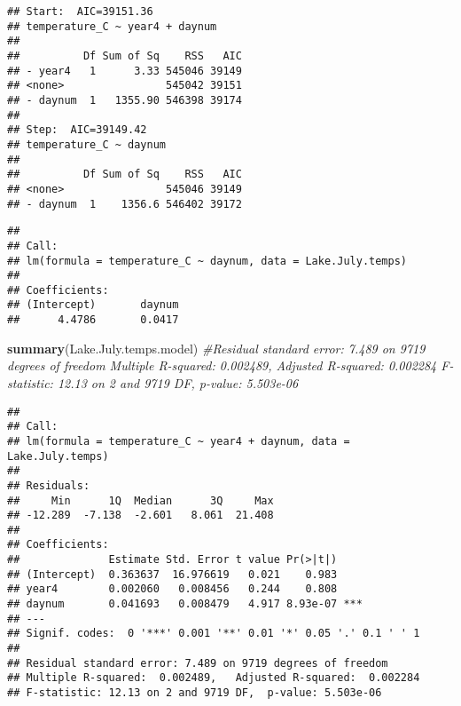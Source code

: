 \documentclass[]{article}
\newenvironment{Shaded}{\begin{snugshade}}{\end{snugshade}}
\newcommand{\KeywordTok}[1]{\textcolor[rgb]{0.13,0.29,0.53}{\textbf{#1}}}
\newcommand{\DataTypeTok}[1]{\textcolor[rgb]{0.13,0.29,0.53}{#1}}
\newcommand{\StringTok}[1]{\textcolor[rgb]{0.31,0.60,0.02}{#1}}
\newcommand{\CommentTok}[1]{\textcolor[rgb]{0.56,0.35,0.01}{\textit{#1}}}
\newcommand{\OperatorTok}[1]{\textcolor[rgb]{0.81,0.36,0.00}{\textbf{#1}}}
\newcommand{\NormalTok}[1]{#1}
\begin{document}
\begin{verbatim}
## Start:  AIC=39151.36
## temperature_C ~ year4 + daynum
## 
##          Df Sum of Sq    RSS   AIC
## - year4   1      3.33 545046 39149
## <none>                545042 39151
## - daynum  1   1355.90 546398 39174
## 
## Step:  AIC=39149.42
## temperature_C ~ daynum
## 
##          Df Sum of Sq    RSS   AIC
## <none>                545046 39149
## - daynum  1    1356.6 546402 39172
\end{verbatim}

\begin{verbatim}
## 
## Call:
## lm(formula = temperature_C ~ daynum, data = Lake.July.temps)
## 
## Coefficients:
## (Intercept)       daynum  
##      4.4786       0.0417
\end{verbatim}

\begin{Shaded}
\begin{Highlighting}[]
\KeywordTok{summary}\NormalTok{(Lake.July.temps.model) }\CommentTok{#Residual standard error: 7.489 on 9719 degrees of freedom Multiple R-squared:  0.002489,    Adjusted R-squared:  0.002284 F-statistic: 12.13 on 2 and 9719 DF,  p-value: 5.503e-06}
\end{Highlighting}
\end{Shaded}

\begin{verbatim}
## 
## Call:
## lm(formula = temperature_C ~ year4 + daynum, data = Lake.July.temps)
## 
## Residuals:
##     Min      1Q  Median      3Q     Max 
## -12.289  -7.138  -2.601   8.061  21.408 
## 
## Coefficients:
##              Estimate Std. Error t value Pr(>|t|)    
## (Intercept)  0.363637  16.976619   0.021    0.983    
## year4        0.002060   0.008456   0.244    0.808    
## daynum       0.041693   0.008479   4.917 8.93e-07 ***
## ---
## Signif. codes:  0 '***' 0.001 '**' 0.01 '*' 0.05 '.' 0.1 ' ' 1
## 
## Residual standard error: 7.489 on 9719 degrees of freedom
## Multiple R-squared:  0.002489,   Adjusted R-squared:  0.002284 
## F-statistic: 12.13 on 2 and 9719 DF,  p-value: 5.503e-06
\end{verbatim}

\begin{Shaded}
\end{Shaded}
\end{document}
